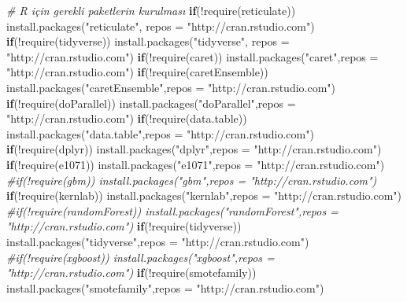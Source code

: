 \documentclass[12pt,twoside]{deuthesis}
\newenvironment{Shaded}{\begin{snugshade}}{\end{snugshade}}
\newcommand{\AttributeTok}[1]{\textcolor[rgb]{0.77,0.63,0.00}{#1}}
\newcommand{\CommentTok}[1]{\textcolor[rgb]{0.56,0.35,0.01}{\textit{#1}}}
\newcommand{\ControlFlowTok}[1]{\textcolor[rgb]{0.13,0.29,0.53}{\textbf{#1}}}
\newcommand{\FunctionTok}[1]{\textcolor[rgb]{0.00,0.00,0.00}{#1}}
\newcommand{\NormalTok}[1]{#1}
\newcommand{\SpecialCharTok}[1]{\textcolor[rgb]{0.00,0.00,0.00}{#1}}
\newcommand{\StringTok}[1]{\textcolor[rgb]{0.31,0.60,0.02}{#1}}
\begin{document}
\scriptsize
\begin{Shaded}
\begin{Highlighting}[]
\CommentTok{\# R için gerekli paketlerin kurulması}
\ControlFlowTok{if}\NormalTok{(}\SpecialCharTok{!}\FunctionTok{require}\NormalTok{(reticulate)) }\FunctionTok{install.packages}\NormalTok{(}\StringTok{"reticulate"}\NormalTok{, }\AttributeTok{repos =} \StringTok{"http://cran.rstudio.com"}\NormalTok{)}
\ControlFlowTok{if}\NormalTok{(}\SpecialCharTok{!}\FunctionTok{require}\NormalTok{(tidyverse)) }\FunctionTok{install.packages}\NormalTok{(}\StringTok{"tidyverse"}\NormalTok{, }\AttributeTok{repos =} \StringTok{"http://cran.rstudio.com"}\NormalTok{)}
\ControlFlowTok{if}\NormalTok{(}\SpecialCharTok{!}\FunctionTok{require}\NormalTok{(caret)) }\FunctionTok{install.packages}\NormalTok{(}\StringTok{"caret"}\NormalTok{,}\AttributeTok{repos =} \StringTok{"http://cran.rstudio.com"}\NormalTok{)}
\ControlFlowTok{if}\NormalTok{(}\SpecialCharTok{!}\FunctionTok{require}\NormalTok{(caretEnsemble))  }\FunctionTok{install.packages}\NormalTok{(}\StringTok{"caretEnsemble"}\NormalTok{,}\AttributeTok{repos =} \StringTok{"http://cran.rstudio.com"}\NormalTok{)}
\ControlFlowTok{if}\NormalTok{(}\SpecialCharTok{!}\FunctionTok{require}\NormalTok{(doParallel))  }\FunctionTok{install.packages}\NormalTok{(}\StringTok{"doParallel"}\NormalTok{,}\AttributeTok{repos =} \StringTok{"http://cran.rstudio.com"}\NormalTok{)}
\ControlFlowTok{if}\NormalTok{(}\SpecialCharTok{!}\FunctionTok{require}\NormalTok{(data.table))  }\FunctionTok{install.packages}\NormalTok{(}\StringTok{"data.table"}\NormalTok{,}\AttributeTok{repos =} \StringTok{"http://cran.rstudio.com"}\NormalTok{)}
\ControlFlowTok{if}\NormalTok{(}\SpecialCharTok{!}\FunctionTok{require}\NormalTok{(dplyr))  }\FunctionTok{install.packages}\NormalTok{(}\StringTok{"dplyr"}\NormalTok{,}\AttributeTok{repos =} \StringTok{"http://cran.rstudio.com"}\NormalTok{)}
\ControlFlowTok{if}\NormalTok{(}\SpecialCharTok{!}\FunctionTok{require}\NormalTok{(e1071))  }\FunctionTok{install.packages}\NormalTok{(}\StringTok{"e1071"}\NormalTok{,}\AttributeTok{repos =} \StringTok{"http://cran.rstudio.com"}\NormalTok{)}
\CommentTok{\#if(!require(gbm))  install.packages("gbm",repos = "http://cran.rstudio.com")}
\ControlFlowTok{if}\NormalTok{(}\SpecialCharTok{!}\FunctionTok{require}\NormalTok{(kernlab))  }\FunctionTok{install.packages}\NormalTok{(}\StringTok{"kernlab"}\NormalTok{,}\AttributeTok{repos =} \StringTok{"http://cran.rstudio.com"}\NormalTok{)}
\CommentTok{\#if(!require(randomForest))  install.packages("randomForest",repos = "http://cran.rstudio.com")}
\ControlFlowTok{if}\NormalTok{(}\SpecialCharTok{!}\FunctionTok{require}\NormalTok{(tidyverse))  }\FunctionTok{install.packages}\NormalTok{(}\StringTok{"tidyverse"}\NormalTok{,}\AttributeTok{repos =} \StringTok{"http://cran.rstudio.com"}\NormalTok{)}
\CommentTok{\#if(!require(xgboost))  install.packages("xgboost",repos = "http://cran.rstudio.com")}
\ControlFlowTok{if}\NormalTok{(}\SpecialCharTok{!}\FunctionTok{require}\NormalTok{(smotefamily))  }\FunctionTok{install.packages}\NormalTok{(}\StringTok{"smotefamily"}\NormalTok{,}\AttributeTok{repos =} \StringTok{"http://cran.rstudio.com"}\NormalTok{)}
\end{Highlighting}
\end{Shaded}
\end{document}
